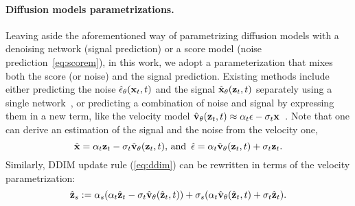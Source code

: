 \paragraph{Diffusion models parametrizations.}
Leaving aside the aforementioned way of parametrizing diffusion models with a denoising network (signal prediction) or a score model (noise prediction~\eqref{eq:scorem}), in this work, we adopt a parameterization that mixes both the score (or noise) and the signal prediction. %
%
Existing methods include either predicting the noise $\hat{\epsilon}_\theta(\mathbf{x}_t,t)$ and the signal $\hat{\mathbf{x}}_\theta(\mathbf{z}_t,t)$ separately using a single network~\cite{dhariwal2021diffusion}, or predicting a combination of noise and signal by expressing them in a new term, like the velocity model $\hat{\mathbf{v}}_\theta (\mathbf{z}_t, t) \approx \alpha_t \epsilon - \sigma_t \mathbf{x}$~\cite{salimans2022progressive}.
Note that one can derive an estimation of the signal and the noise from the velocity one,
\begin{equation}
    \hat{\mathbf{x}} = \alpha_t \mathbf{z}_t - \sigma_t \hat{\mathbf{v}}_\theta (\mathbf{z}_t, t), \, \mathrm{and}\,\,\, \hat{\epsilon} = \alpha_t \hat{\mathbf{v}}_\theta (\mathbf{z}_t, t)  + \sigma_t \mathbf{z}_t.
    \label{eq:v}
\end{equation}
Similarly, DDIM update rule (\eqref{eq:ddim}) can be rewritten in terms of the velocity parametrization:
\begin{equation}
        \hat{\mathbf{z}}_s := \alpha_s (\alpha_t \hat{\mathbf{z}}_t - \sigma_t \hat{\mathbf{v}}_\theta (\hat{\mathbf{z}}_t, t)) + \sigma_s (\alpha_t \hat{\mathbf{v}}_\theta (\hat{\mathbf{z}}_t, t)  + \sigma_t \hat{\mathbf{z}}_t).
    \label{eq:vddim}
\end{equation}

